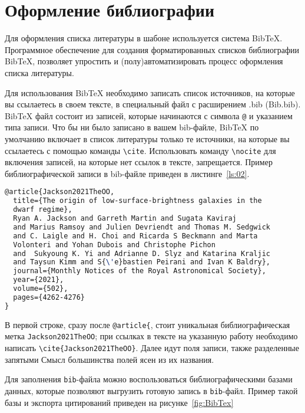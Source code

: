 \chapter{Оформление библиографии}\label{Bib_chapter}

Для оформления списка литературы в шабоне используется система Bib\TeX.  Программное обеспечение для создания форматированных списков библиографии Bib\TeX, позволяет упростить и (полу)автоматизировать процесс оформления списка литературы. 

Для использования Bib\TeX{} необходимо записать список источников, на которые вы ссылаетесь в своем тексте, в специальный файл с расширением .bib (Bib.bib). Bib\TeX{} файл состоит из записей, которые начинаются с символа \verb|@| и указанием типа записи. Что бы ни было записано в вашем bib-файле, Bib\TeX{} по умолчанию включает в список литературы только те источники, на которые вы ссылаетесь с помощью команды \verb|\cite|. Использовать команду \verb|\nocite| для включения записей, на которые нет ссылок в тексте, запрещается. Пример библиографической записи \cite{Jackson2021TheOO} в bib-файле приведен в листинге~\ref{ls:02}.

\begin{lstlisting}[caption={Пример библиографической записи}, label={ls:02}, language=TeX]
@article{Jackson2021TheOO,
  title={The origin of low-surface-brightness galaxies in the 
  dwarf regime},
  Ryan A. Jackson and Garreth Martin and Sugata Kaviraj 
  and Marius Ramsoy and Julien Devriendt and Thomas M. Sedgwick 
  and C. Laigle and H. Choi and Ricarda S Beckmann and Marta 
  Volonteri and Yohan Dubois and Christophe Pichon 
  and  Sukyoung K. Yi and Adrianne D. Slyz and Katarina Kraljic 
  and Taysun Kimm and S{\'e}bastien Peirani and Ivan K Baldry},
  journal={Monthly Notices of the Royal Astronomical Society},
  year={2021},
  volume={502},
  pages={4262-4276}
}
\end{lstlisting}

В первой строке, сразу после \verb|@article{|, стоит уникальная библиографическая метка \verb|Jackson2021TheOO|; при ссылках в тексте на указанную работу необходимо написать  \verb|\cite{Jackson2021TheOO}|. Далее идут поля записи, также разделенные запятыми  Смысл большинства полей ясен из их названия. 

Для заполнения \verb|bib|-файла можно воспользоваться библиографическими базами данных, которые позволяют выгрузить готовую запись в \verb|bib|-файл. Пример такой базы и экспорта цитирований приведен на рисунке~\ref{fig:BibTex} 

